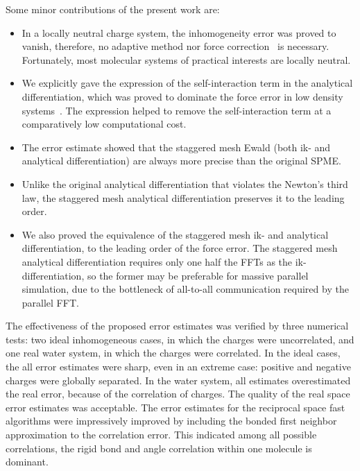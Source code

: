 \documentclass[journal=jacsat,manuscript=article]{achemso}
\newcommand{\recheck}[1]{{\color{black} #1}}
\newcommand{\redc}[1]{{\color{black} #1}}
\begin{document}

Some minor contributions of the present work are:
\begin{itemize}\itemsep -3pt
\item In a locally neutral charge system, the inhomogeneity
  error was proved to vanish, therefore, no adaptive method nor
  force correction~\cite{wang2012} is necessary. Fortunately, most
  molecular systems of practical interests are locally neutral.
\item We explicitly gave the expression of the self-interaction term
  in the analytical differentiation, which was proved to \redc{dominate} the
  force error in low density systems~\cite{cerutti2009staggered}.  The
  expression helped \redc{to remove} the self-interaction term at a comparatively low
  computational cost.
\item The error estimate showed that the staggered mesh Ewald
  (both ik- and analytical differentiation) are always more precise than
  the original SPME.
\item Unlike the original analytical differentiation
  that violates the Newton's third law, the staggered mesh analytical
  differentiation preserves it to the leading order.
\item We also proved the equivalence of the staggered mesh ik- and analytical
  differentiation, to the leading order of the force error.
  The staggered mesh analytical differentiation requires only one half \redc{the}
  FFTs as the ik-differentiation, so the former may be preferable
  for massive parallel simulation, due to the bottleneck of all-to-all
  communication required by the parallel FFT.
\end{itemize}

The effectiveness of the proposed error estimates was verified by
three numerical tests: two ideal inhomogeneous cases, in which the charges
were uncorrelated,
and one real water system, in which the charges were correlated.
In the ideal cases, the all error estimates were sharp, even in an extreme
case: positive and negative charges were globally separated. 
In the water system,  all estimates overestimated the real error,
because of the correlation of charges.
The quality of the real space error estimates 
was acceptable.
The error estimates for the reciprocal space fast algorithms
were impressively improved by including the \recheck{bonded}
first neighbor approximation
to the correlation error.
This indicated among all possible correlations,
the rigid bond and angle correlation within one molecule
is dominant.
\end{document}
